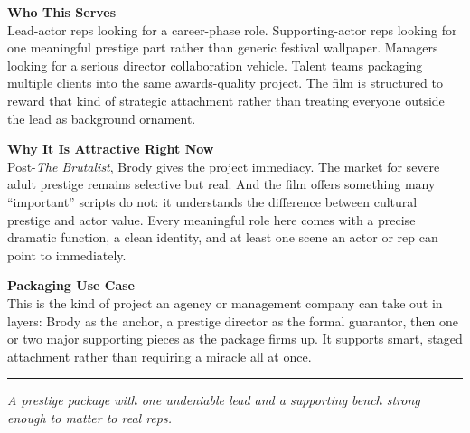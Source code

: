 \documentclass[11pt,letterpaper]{article}
\begin{document}
\vspace{2pt}

\textbf{Who This Serves}\\
Lead-actor reps looking for a career-phase role. Supporting-actor reps looking for one meaningful prestige part rather than generic festival wallpaper. Managers looking for a serious director collaboration vehicle. Talent teams packaging multiple clients into the same awards-quality project. The film is structured to reward that kind of strategic attachment rather than treating everyone outside the lead as background ornament.

\vspace{2pt}

\textbf{Why It Is Attractive Right Now}\\
Post-\textit{The Brutalist}, Brody gives the project immediacy. The market for severe adult prestige remains selective but real. And the film offers something many ``important'' scripts do not: it understands the difference between cultural prestige and actor value. Every meaningful role here comes with a precise dramatic function, a clean identity, and at least one scene an actor or rep can point to immediately.

\vspace{2pt}

\textbf{Packaging Use Case}\\
This is the kind of project an agency or management company can take out in layers: Brody as the anchor, a prestige director as the formal guarantor, then one or two major supporting pieces as the package firms up. It supports smart, staged attachment rather than requiring a miracle all at once.

\vspace{4pt}
\textcolor{sectionrule}{\rule{\textwidth}{0.5pt}}
\vspace{2pt}
\begin{center}
{\small\color{kafkalight}\textit{A prestige package with one undeniable lead and a supporting bench strong enough to matter to real reps.}}
\end{center}
\end{document}
